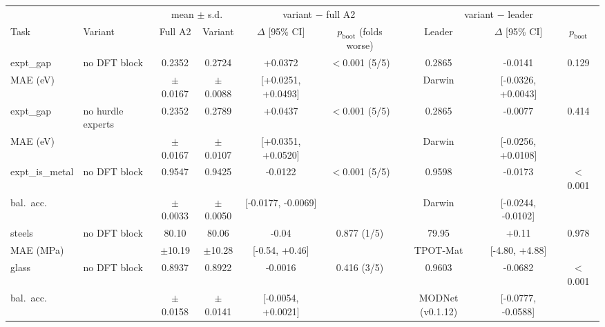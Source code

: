 \begin{tabular}{llccccccc}
\toprule
 & & \multicolumn{2}{c}{mean $\pm$ s.d.} & \multicolumn{2}{c}{variant $-$ full A2} & \multicolumn{3}{c}{variant $-$ leader} \\
\cmidrule(lr){3-4}\cmidrule(lr){5-6}\cmidrule(lr){7-9}
Task & Variant & Full A2 & Variant & $\Delta$ [95\% CI] & $p_\mathrm{boot}$ (folds worse) & Leader & $\Delta$ [95\% CI] & $p_\mathrm{boot}$ \\
\midrule
expt\_gap & no DFT block & 0.2352 & 0.2724 & +0.0372 & $<$0.001 (5/5) & 0.2865 & -0.0141 & 0.129 \\
\quad MAE (eV) & & $\pm$0.0167 & $\pm$0.0088 & [+0.0251, +0.0493] & & Darwin & [-0.0326, +0.0043] & \\[3pt]
expt\_gap & no hurdle experts & 0.2352 & 0.2789 & +0.0437 & $<$0.001 (5/5) & 0.2865 & -0.0077 & 0.414 \\
\quad MAE (eV) & & $\pm$0.0167 & $\pm$0.0107 & [+0.0351, +0.0520] & & Darwin & [-0.0256, +0.0108] & \\[3pt]
expt\_is\_metal & no DFT block & 0.9547 & 0.9425 & -0.0122 & $<$0.001 (5/5) & 0.9598 & -0.0173 & $<$0.001 \\
\quad bal.\ acc. & & $\pm$0.0033 & $\pm$0.0050 & [-0.0177, -0.0069] & & Darwin & [-0.0244, -0.0102] & \\[3pt]
steels & no DFT block & 80.10 & 80.06 & -0.04 & 0.877 (1/5) & 79.95 & +0.11 & 0.978 \\
\quad MAE (MPa) & & $\pm$10.19 & $\pm$10.28 & [-0.54, +0.46] & & TPOT-Mat & [-4.80, +4.88] & \\[3pt]
glass & no DFT block & 0.8937 & 0.8922 & -0.0016 & 0.416 (3/5) & 0.9603 & -0.0682 & $<$0.001 \\
\quad bal.\ acc. & & $\pm$0.0158 & $\pm$0.0141 & [-0.0054, +0.0021] & & MODNet (v0.1.12) & [-0.0777, -0.0588] & \\[3pt]
\bottomrule
\end{tabular}
